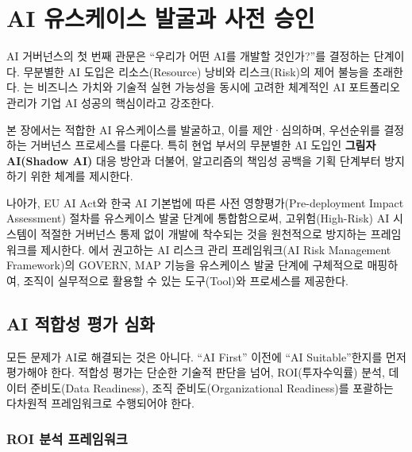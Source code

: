 
\chapter{AI 유스케이스 발굴과 사전 승인}
\label{ch:usecase_discovery}

AI 거버넌스의 첫 번째 관문은 ``우리가 어떤 AI를 개발할 것인가?''를 결정하는 단계이다. 무분별한 AI 도입은 리소스(Resource) 낭비와 리스크(Risk)의 제어 불능을 초래한다. \cite{davenport2018advantage}는 비즈니스 가치\cite{enholm2022artificial}와 기술적 실현 가능성을 동시에 고려한 체계적인 AI 포트폴리오\cite{iansiti2020competing} 관리가 기업 AI 성공의 핵심이라고 강조한다.

본 장에서는 적합한 AI 유스케이스를 발굴하고, 이를 제안·심의하며, 우선순위를 결정하는 거버넌스 프로세스를 다룬다. 특히 현업 부서의 무분별한 AI 도입인 \textbf{그림자 AI(Shadow AI)} \cite{gartner2023shadow} 대응 방안과 더불어, 알고리즘의 책임성 공백을 기획 단계부터 방지하기 위한 체계를 제시한다.\cite{raji2020closing}

나아가, EU AI Act\cite{eu2024aiact}와 한국 AI 기본법\cite{cset2025korea_ai_act}에 따른 사전 영향평가(Pre-deployment Impact Assessment) 절차를 유스케이스 발굴 단계에 통합함으로써, 고위험(High-Risk) AI 시스템이 적절한 거버넌스 통제 없이 개발에 착수되는 것을 원천적으로 방지하는 프레임워크를 제시한다. \cite{nist2023airmf}에서 권고하는 AI 리스크 관리 프레임워크(AI Risk Management Framework)의 GOVERN, MAP 기능을 유스케이스 발굴 단계에 구체적으로 매핑하여, 조직이 실무적으로 활용할 수 있는 도구(Tool)와 프로세스를 제공한다.

\section{AI 적합성 평가 심화}
\label{sec:8.1}

모든 문제가 AI로 해결되는 것은 아니다. ``AI First'' 이전에 ``AI Suitable''한지를 먼저 평가해야 한다. 적합성 평가는 단순한 기술적 판단을 넘어, ROI(투자수익률) 분석, 데이터 준비도\cite{sambasivan2021everyone}(Data Readiness), 조직 준비도\cite{fountaine2019building}(Organizational Readiness)를 포괄하는 다차원적 프레임워크로 수행되어야 한다.

\subsection{ROI 분석 프레임워크}
\label{sec:8.1.1}

